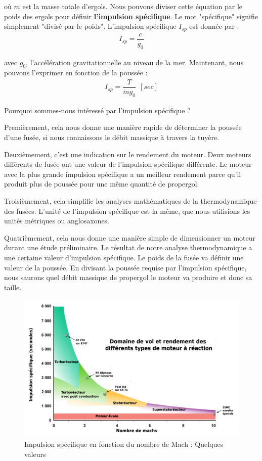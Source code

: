 \documentclass{report}
\begin{document}
où $m$ est la masse totale d'ergols. Nous pouvons diviser cette équation par le poids des ergols pour définir \textbf{l'impulsion spécifique}. Le mot "spécifique" signifie simplement "divisé par le poids". L'impulsion spécifique $I_{sp}$ est donnée par :
\begin{eqnarray}
I_{sp}  = \dfrac{c}{g_0}
\end{eqnarray}

avec $g_0$, l'accélération gravitationnelle au niveau de la mer. Maintenant, nous pouvons l'exprimer en fonction de la poussée :
\begin{eqnarray}
I_{sp} = \dfrac{T}{\dot{m} g_0}~~[sec]
\end{eqnarray}

Pourquoi sommes-nous intéressé par l'impulsion spécifique ? 

Premièrement, cela nous donne une manière rapide de déterminer la poussée d'une fusée, si nous connaissons le débit massique à travers la tuyère. 

Deuxièmement, c'est une indication sur le rendement du moteur. Deux moteurs différents de fusée ont une valeur de l'impulsion spécifique différente. Le moteur avec la plus grande impulsion spécifique a un meilleur rendement parce qu'il produit plus de poussée pour une même quantité de propergol. 

Troisièmement, cela simplifie les analyses mathématiques de la thermodynamique des fusées. L'unité de l'impulsion spécifique est la même, que nous utilisions les unités métriques ou anglosaxones.

Quatrièmement, cela nous donne une manière simple de dimensionner un moteur durant une étude préliminaire. Le résultat de notre analyse thermodynamique a une certaine valeur d'impulsion spécifique. Le poids de la fusée va définir une valeur de la poussée. En divisant la poussée requise par l'impulsion spécifique, nous saurons quel débit massique de propergol le moteur va produire et donc sa taille.

\begin{figure}[h!]
    \centering
    \includegraphics[scale=0.4]{51.JPG}
    \caption{Impulsion spécifique en fonction du nombre de Mach : Quelques valeurs}
    \label{51}
\end{figure}
\end{document}
